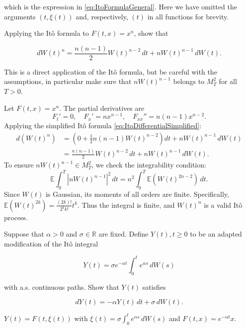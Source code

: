 which is the expression in \eqref{eq:ItoFormulaGeneral}. Here we have omitted the arguments $(t, \xi(t))$ and, respectively, $(t)$ in all functions for brevity.

\begin{Exercise}
\label{ex:7.15}
Applying the Itô formula to $F(t, x) = x^n$, show that

\begin{equation}
dW(t)^n = \frac{n(n-1)}{2} W(t)^{n-2} \, dt + n W(t)^{n-1} \, dW(t).
\label{eq:W^n_differential}
\end{equation}

\begin{hint}
This is a direct application of the Itô formula, but be careful with the assumptions, in particular make sure that $nW(t)^{n-1}$ belongs to $M_T^2$ for all $T > 0$.
\end{hint}
\end{Exercise}

\begin{Solution}
Let $F(t, x) = x^n$. The partial derivatives are
\begin{equation*}
F_t' = 0, \quad F_x' = n x^{n-1}, \quad F_{xx}'' = n(n-1) x^{n-2}.
\end{equation*}
Applying the simplified Itô formula \eqref{eq:ItoDifferentialSimplified}:
\begin{align*}
d(W(t)^n) &= \left( 0 + \frac{1}{2} n(n-1) W(t)^{n-2} \right) dt + n W(t)^{n-1} \, dW(t) \\
&= \frac{n(n-1)}{2} W(t)^{n-2} \, dt + n W(t)^{n-1} \, dW(t).
\end{align*}
To ensure $n W(t)^{n-1} \in M_T^2$, we check the integrability condition:
\begin{equation*}
\mathbb{E} \int_0^T |n W(t)^{n-1}|^2 \, dt = n^2 \int_0^T \mathbb{E}(W(t)^{2n-2}) \, dt.
\end{equation*}
Since $W(t)$ is Gaussian, its moments of all orders are finite. Specifically, $\mathbb{E}(W(t)^{2k}) = \frac{(2k)!}{2^k k!} t^k$. Thus the integral is finite, and $W(t)^n$ is a valid Itô process.
\end{Solution}

\begin{Exercise}
\label{ex:7.16}
Suppose that $\alpha > 0$ and $\sigma \in \mathbb{R}$ are fixed. Define $Y(t), t \geq 0$ to be an adapted modification of the Itô integral

\begin{equation}
Y(t) = \sigma e^{-\alpha t} \int_0^t e^{\alpha s} \, dW(s)
\end{equation}

with a.s. continuous paths. Show that $Y(t)$ satisfies

\begin{equation}
dY(t) = -\alpha Y(t) \, dt + \sigma \, dW(t).
\end{equation}

\begin{hint}
$Y(t) = F(t, \xi(t))$ with $\xi(t) = \sigma \int_0^t e^{\alpha s} \, dW(s)$ and $F(t, x) = e^{-\alpha t} x$.
\end{hint}
\end{Exercise}

